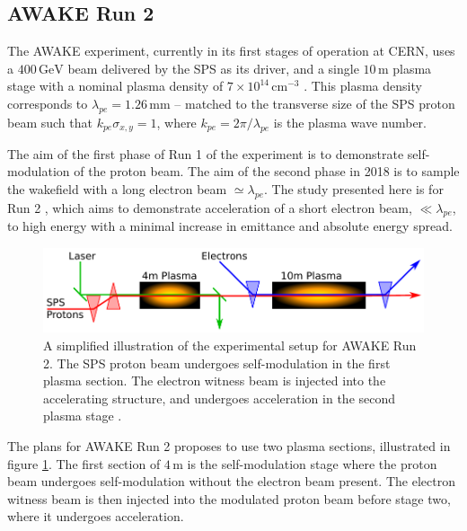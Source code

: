 \documentclass[aps,prstab,reprint,amsmath,amssymb,groupedaddress]{revtex4-1}
\newcommand{\unit}[1]{\,\mathrm{#1}}
\newcommand{\nexp}[1]{\times 10^{#1}}
\begin{document}
\subsection{AWAKE Run 2}\label{S:I:AWAKE}

The AWAKE experiment, currently in its first stages of operation at CERN, uses a $400\unit{GeV}$ beam delivered by the
SPS as its driver, and a single $10\unit{m}$ plasma stage with a nominal plasma density of $7\nexp{14}\unit{cm}^{-3}$
\cite{gschwendtner:2016}. This plasma density corresponds to $\lambda_{pe} = 1.26\unit{mm}$ -- matched to the transverse
size of the SPS proton beam such that $k_{pe}\sigma_{x,y} = 1$, where $k_{pe} = 2\pi/\lambda_{pe}$ is the plasma wave
number.

The aim of the first phase of Run 1 of the experiment is to demonstrate self-modulation of the proton beam. The aim of
the second phase in 2018 is to sample the wakefield with a long electron beam $\simeq\lambda_{pe}$. The study presented
here is for Run 2 \cite{adli:2016}, which aims to demonstrate acceleration of a short electron beam, $\ll\lambda_{pe}$,
to high energy with a minimal increase in emittance and absolute energy spread.

\begin{figure}[hbt]
    \includegraphics[width=0.99\linewidth,trim={1mm 2mm 1mm 2mm},clip]{figures/figAWAKE}
    \caption{\label{Fig:AWAKER2} A simplified illustration of the experimental setup for AWAKE Run 2. The SPS proton
        beam undergoes self-modulation in the first plasma section. The electron witness beam is injected into the
        accelerating structure, and undergoes acceleration in the second plasma stage
        \cite{berglyd_olsen:2015, adli:2016}.}
\end{figure}

The plans for AWAKE Run 2 proposes to use two plasma sections, illustrated in figure \ref{Fig:AWAKER2}. The first
section of $4\unit{m}$ is the self-modulation stage where the proton beam undergoes self-modulation without the electron
beam present. The electron witness beam is then injected into the modulated proton beam before stage two, where it
undergoes acceleration.
\end{document}
